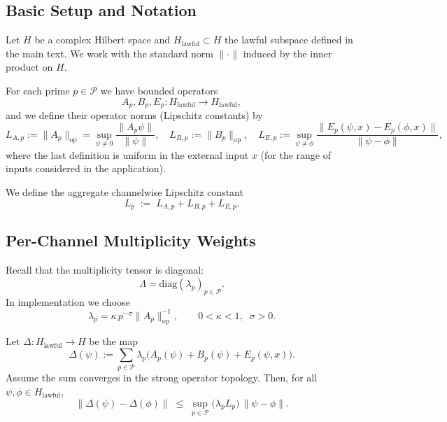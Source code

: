\documentclass[11pt]{article}
\begin{document}
\subsection{Basic Setup and Notation}

Let $H$ be a complex Hilbert space and $H_{\text{lawful}} \subset H$ the lawful subspace defined in the main text.
We work with the standard norm $\|\cdot\|$ induced by the inner product on $H$.

For each prime $p \in \mathcal{P}$ we have bounded operators
\[
  A_p, B_p, E_p : H_{\text{lawful}} \to H_{\text{lawful}},
\]
and we define their operator norms (Lipschitz constants) by
\[
  L_{A,p} := \|A_p\|_{\mathrm{op}} =
  \sup_{\psi \ne 0} \frac{\|A_p \psi\|}{\|\psi\|},
  \quad
  L_{B,p} := \|B_p\|_{\mathrm{op}},
  \quad
  L_{E,p} := \sup_{\psi \ne \phi}
    \frac{\|E_p(\psi,x) - E_p(\phi,x)\|}{\|\psi - \phi\|},
\]
where the last definition is uniform in the external input $x$ (for the range of inputs considered in the application).

We define the aggregate channelwise Lipschitz constant
\begin{equation}
  L_p \;:=\; L_{A,p} + L_{B,p} + L_{E,p}.
\end{equation}

\subsection{Per-Channel Multiplicity Weights}

Recall that the multiplicity tensor is diagonal:
\begin{equation}
  \Lambda = \mathrm{diag}(\lambda_p)_{p \in \mathcal{P}}.
\end{equation}
In implementation we choose
\begin{equation}
  \lambda_p = \kappa\, p^{-\sigma} \|A_p\|_{\mathrm{op}}^{-1},
  \qquad 0 < \kappa < 1, \;\; \sigma > 0.
\end{equation}

\begin{lemma}
\label{lem:channel-lip}
Let $\Delta : H_{\text{lawful}} \to H$ be the map
\begin{equation}
  \Delta(\psi) :=
  \sum_{p \in \mathcal{P}} \lambda_p\bigl( A_p(\psi) + B_p(\psi) + E_p(\psi,x) \bigr).
\end{equation}
Assume the sum converges in the strong operator topology.
Then, for all $\psi,\phi \in H_{\text{lawful}}$,
\begin{equation}
  \|\Delta(\psi) - \Delta(\phi)\|
  \;\le\;
  \sup_{p \in \mathcal{P}} \bigl(\lambda_p L_p\bigr) \, \|\psi - \phi\|.
\end{equation}
\end{lemma}
\end{document}

